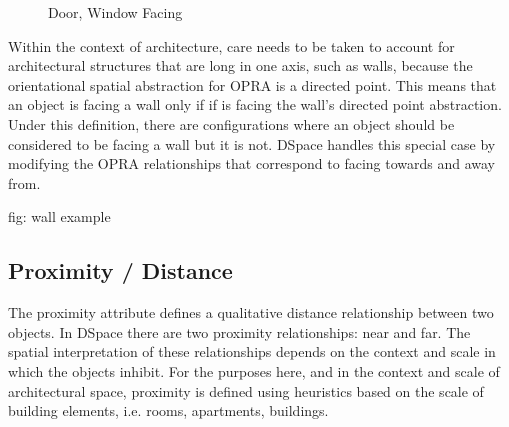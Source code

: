 \documentclass[12pt]{ucthesis}
\begin{document}
\begin{figure}[H]
 \centering
  \hspace{10 mm}

 \caption{Door, Window Facing}
\label{door-window-facing}
\end{figure}

Within the context of architecture, care needs to be taken to account for architectural structures that are long in one axis, such as walls, because the orientational spatial abstraction for OPRA is a directed point. This means that an object is facing a wall only if if is facing the wall's directed point abstraction. Under this definition, there are configurations where an object should be considered to be facing a wall but it is not. DSpace handles this special case by modifying the OPRA relationships that correspond to facing towards and away from. 

fig: wall example

\subsection{Proximity / Distance}
The proximity attribute defines a qualitative distance relationship between two objects. In DSpace there are two proximity relationships: near and far. The spatial interpretation of these relationships depends on the context and scale in which the objects inhibit. For the purposes here, and in the context and scale of architectural space, proximity is defined using heuristics based on the scale of building elements, i.e. rooms, apartments, buildings.
\end{document}
